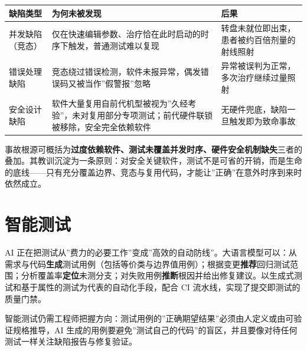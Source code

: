 \documentclass[
]{ctexbook}
\newcounter{none}
\begin{document}
{\def\LTcaptype{none} %
\begin{longtable}[]{@{}
  >{\raggedright\arraybackslash}p{}
  >{\raggedright\arraybackslash}p{}
  >{\raggedright\arraybackslash}p{}@{}}
\toprule\noalign{}
\begin{minipage}[b]{\linewidth}\raggedright
缺陷类型
\end{minipage} & \begin{minipage}[b]{\linewidth}\raggedright
为何未被发现
\end{minipage} & \begin{minipage}[b]{\linewidth}\raggedright
后果
\end{minipage} \\
\midrule\noalign{}
\endhead
\bottomrule\noalign{}
\endlastfoot
并发缺陷（竞态） &
仅在快速编辑参数、治疗恰在此时启动的时序下触发，普通测试难以复现 &
转盘未就位即出束，患者被约百倍剂量的射线照射 \\
错误处理缺陷 &
竞态绕过错误检测，软件未报异常，偶发错误码又被当作''假警报''忽略 &
异常被误判为正常，多次治疗继续过量照射 \\
安全设计缺陷 &
软件大量复用自前代机型被视为''久经考验''，未对复用部分专项测试；前代硬件联锁被移除，安全完全依赖软件
& 无硬件兜底，缺陷一旦触发即为致命事故 \\
\end{longtable}
}

事故根源可概括为\textbf{过度依赖软件、测试未覆盖并发时序、硬件安全机制缺失}三者的叠加。其教训沉淀为一条原则：对安全关键软件，测试不是可省的开销，而是生命的底线------只有充分覆盖边界、竞态与复用代码，才能让''正确''在意外时序到来时依然成立。

\section{智能测试}\label{ux667aux80fdux6d4bux8bd5}

AI
正在把测试从''费力的必要工作''变成''高效的自动防线''。大语言模型可以：从需求与代码\textbf{生成}测试用例（包括等价类与边界值用例）；根据变更\textbf{推荐}回归测试范围；分析覆盖率\textbf{定位}未测分支；对失败用例\textbf{推断}根因并给出修复建议。以生成式测试和基于属性的测试为代表的自动化手段，配合
CI 流水线，实现了提交即测试的质量门禁。

智能测试仍需工程师把握方向：测试用例的''正确期望结果''必须由人定义或由可验证规格推导，AI
生成的用例要避免''测试自己的代码''的盲区，并且要像对待任何测试一样关注缺陷报告与修复验证。
\end{document}
